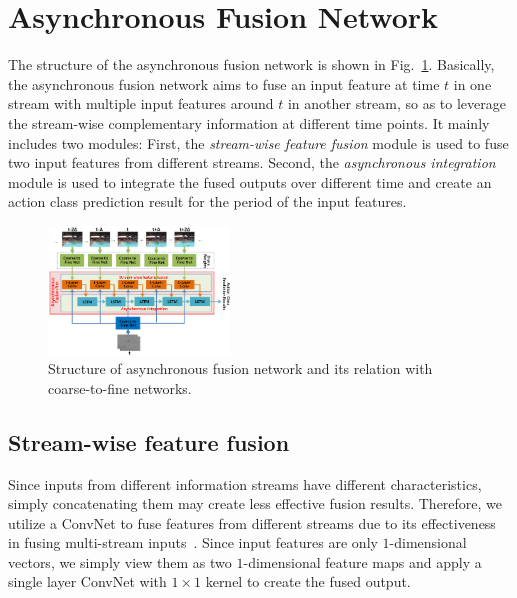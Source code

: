 \documentclass[letterpaper]{article} %
\begin{document}
\section{Asynchronous Fusion Network}\label{section:Asynchronuous}

The structure of the asynchronous fusion network is shown in Fig.~\ref{fig:asynchronous}. Basically, the asynchronous fusion network aims to fuse an input feature at time $t$ in one stream with multiple input features around $t$ in another stream, so as to leverage the stream-wise complementary information at different time points. It mainly includes two modules: First, the \emph{stream-wise feature fusion} module is used to fuse two input features from different streams. Second, the \emph{asynchronous integration} module is used to integrate the fused outputs over different time and create an action class prediction result for the period of the input features.

\begin{figure}
  \centering
  \includegraphics[width=0.43\textwidth,height=0.27\textwidth]{./figures1/asynchronous.png}
  \caption{Structure of asynchronous fusion network and its relation with coarse-to-fine networks.} %
    \label{fig:asynchronous}
\end{figure}


\subsection{Stream-wise feature fusion}

Since inputs from different information streams have different characteristics, simply concatenating them may create less effective fusion results. Therefore, we utilize a ConvNet to fuse features from different streams due to its effectiveness in fusing multi-stream inputs~\cite{twostreamfuse}. Since input features are only $1$-dimensional vectors, we simply view them as two $1$-dimensional feature maps and apply a single layer ConvNet with $1\times 1$ kernel to create the fused output.
\end{document}
